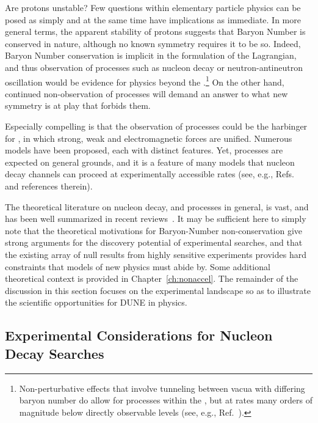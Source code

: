Are protons unstable?  Few questions within elementary 
particle physics can be posed as simply and at the same time 
have implications as immediate.  In more general terms, the 
apparent stability of protons suggests that Baryon Number 
is conserved in nature, although no known symmetry 
requires it to be so.  Indeed, Baryon Number conservation is 
implicit in the formulation of the  Lagrangian, and 
thus observation of  processes such 
as nucleon decay or neutron-antineutron oscillation 
would be evidence for physics beyond the .\footnote{Non-perturbative 
effects that involve tunneling between vacua with differing baryon number 
do allow for  processes within the , but at rates many orders of 
magnitude below directly observable levels (see, e.g., Ref.~\cite{Nath:2006ut}).}
On the other hand, continued non-observation of  processes will 
demand an answer to what new symmetry is at play that forbids 
them.
 
Especially compelling is that the observation of  processes 
could be the harbinger for , in which strong, weak and 
electromagnetic forces are unified.  Numerous  models 
have been proposed, each with distinct features.  Yet,  processes 
are expected on general grounds, and it is a feature of many models 
that nucleon decay channels can proceed at experimentally 
accessible rates (see, e.g., Refs.~\cite{Nath:2006ut,Babu:2013jba} 
and references therein).

The theoretical literature on nucleon decay, and  processes in general,  
is vast, and has been well summarized in recent 
reviews~\cite{Nath:2006ut,Babu:2013jba}.  
It may be sufficient here to simply note that the 
theoretical motivations for Baryon-Number non-conservation give strong 
arguments for the discovery potential of experimental searches, 
and that the existing array of null results from highly sensitive experiments  
provides hard constraints that models of new physics must abide by.
Some additional theoretical context is provided in Chapter~\ref{ch:nonaccel}.
The remainder of the discussion in this section focuses on the experimental 
landscape so as to illustrate the scientific opportunities for DUNE in  physics.

\subsection{Experimental Considerations for Nucleon Decay Searches}
\label{subsec:landscape-ndk-expt}

